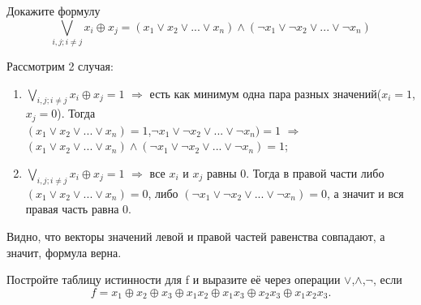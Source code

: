 \begin{exercise}
Докажите формулу
\begin{equation}
		\bigvee_{i,j;i\neq j} x_i\oplus x_j=(x_1\vee x_2\vee ...\vee x_n)\wedge(\neg x_1\vee \neg x_2\vee ...\vee \neg x_n)
		\label{true_eq}
\end{equation}

\end{exercise}

\begin{solution}
Рассмотрим 2 случая: \\
\begin{enumerate}
	\item $\bigvee_{i,j;i\neq j} x_i\oplus x_j=1$ $\Rightarrow$ есть как минимум одна пара разных значений($x_i=1$,$x_j=0$). Тогда\\
$(x_1\vee x_2\vee ...\vee x_n)=1$,$\neg x_1\vee \neg x_2\vee ...\vee \neg x_n)=1$ $\Rightarrow$ $(x_1\vee x_2\vee ...\vee x_n)\wedge(\neg x_1\vee \neg x_2\vee ...\vee \neg x_n)=1$;
	\item $\bigvee_{i,j;i\neq j} x_i\oplus x_j=1$ $\Rightarrow$ все $x_i$ и $x_j$ равны 0. Тогда в правой части либо $(x_1\vee x_2\vee ...\vee x_n)=0$, либо $(\neg x_1\vee \neg x_2\vee ...\vee \neg x_n)=0$, а значит и вся правая часть равна 0.
\end{enumerate}
Видно, что векторы значений левой и правой частей равенства совпадают, а значит, формула верна.

\end{solution}



\begin{exercise}
Постройте таблицу истинности для f и выразите её через операции $\vee$,$\wedge$,$\neg$, если
\begin{equation}
		f=x_1\oplus x_2\oplus x_3\oplus x_1x_2\oplus x_1x_3\oplus x_2x_3\oplus 			x_1x_2x_3.
		\label{true_eq}
\end{equation}

\end{exercise}

